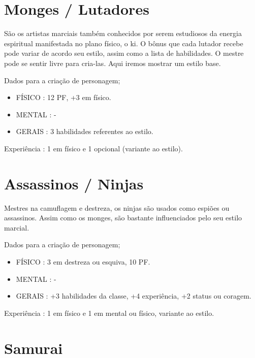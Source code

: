 \section{Monges / Lutadores}

São os artistas marciais também conhecidos por serem estudiosos da energia espiritual manifestada no plano físico, o ki. O bônus que cada lutador recebe pode variar de acordo seu estilo, assim como a lista de habilidades. O mestre pode se sentir livre para cria-las. Aqui iremos mostrar um estilo base. 
 

Dados para a criação de personagem;


\begin{itemize}

	\item FÍSICO : 12 PF, +3 em físico.

	\item MENTAL : -

	\item GERAIS : 3 habilidades referentes ao estilo. 

\end{itemize}

Experiência : 1 em físico e 1 opcional (variante ao estilo).

\section{Assassinos / Ninjas}

Mestres na camuflagem e destreza, os ninjas são usados como espiões ou assassinos. Assim como os monges, são bastante influenciados pelo seu estilo marcial.
 
Dados para a criação de personagem;

\begin{itemize}


	\item FÍSICO : 3 em destreza ou esquiva, 10 PF.  

	\item MENTAL : -

	\item GERAIS : +3 habilidades da classe, +4 experiência, +2 status ou coragem. 

\end{itemize}

Experiência : 1 em físico e 1 em mental ou físico, variante ao estilo.


\section{Samurai}

